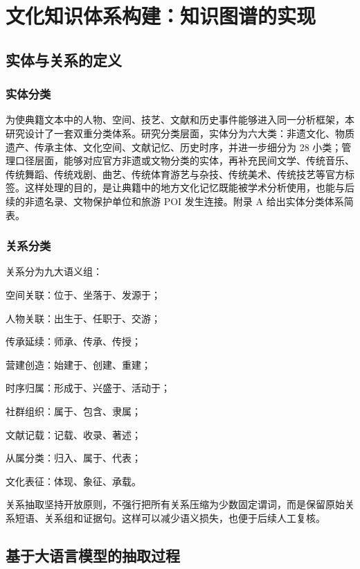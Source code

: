 \chapter{文化知识体系构建：知识图谱的实现}\label{ux6587ux5316ux77e5ux8bc6ux4f53ux7cfbux6784ux5efaux77e5ux8bc6ux56feux8c31ux7684ux5b9eux73b0}

\section{实体与关系的定义}\label{ux5b9eux4f53ux4e0eux5173ux7cfbux7684ux5b9aux4e49}

\subsection{实体分类}\label{ux5b9eux4f53ux5206ux7c7b}

为使典籍文本中的人物、空间、技艺、文献和历史事件能够进入同一分析框架，本研究设计了一套双重分类体系。研究分类层面，实体分为六大类：非遗文化、物质遗产、传承主体、文化空间、文献记忆、历史时序，并进一步细分为 28 小类；管理口径层面，能够对应官方非遗或文物分类的实体，再补充民间文学、传统音乐、传统舞蹈、传统戏剧、曲艺、传统体育游艺与杂技、传统美术、传统技艺等官方标签。这样处理的目的，是让典籍中的地方文化记忆既能被学术分析使用，也能与后续的非遗名录、文物保护单位和旅游 POI 发生连接。附录 A 给出实体分类体系简表。

\subsection{关系分类}\label{ux5173ux7cfbux5206ux7c7b}

关系分为九大语义组：

空间关联：位于、坐落于、发源于；

人物关联：出生于、任职于、交游；

传承延续：师承、传承、传授；

营建创造：始建于、创建、重建；

时序归属：形成于、兴盛于、活动于；

社群组织：属于、包含、隶属；

文献记载：记载、收录、著述；

从属分类：归入、属于、代表；

文化表征：体现、象征、承载。

关系抽取坚持开放原则，不强行把所有关系压缩为少数固定谓词，而是保留原始关系短语、关系组和证据句。这样可以减少语义损失，也便于后续人工复核。

\section{基于大语言模型的抽取过程}\label{ux57faux4e8eux5927ux8bedux8a00ux6a21ux578bux7684ux62bdux53d6ux8fc7ux7a0b}


